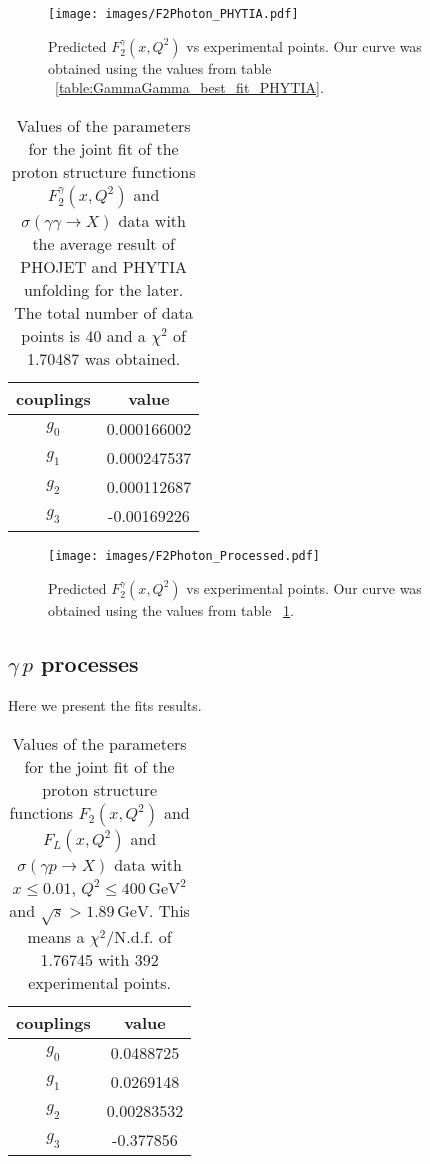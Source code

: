 \documentclass[preprint, 12pt]{elsarticle}
\begin{document}
\begin{figure}[!h]
\center
\texttt{[image: images/F2Photon\_PHYTIA.pdf]} 
\caption{Predicted $F_2^\gamma\left(x, Q^2\right)$ vs experimental points. Our curve was obtained using the values from table ~\ref{table:GammaGamma_best_fit_PHYTIA}.}
\label{fig:F2Photon_best_fit_PHYTIA}
\end{figure}

\begin{table}[b!]
\centering
\caption{Values of the parameters for the joint fit of the proton structure functions $F_2^{\gamma}\left(x, Q^2\right)$ and $\sigma\left(\gamma \gamma \rightarrow X\right)$ data with the average result of PHOJET and PHYTIA unfolding for the later. The total number of data points is 40 and a $\chi^2$ of 1.70487 was obtained.}
\vspace{0.5cm}
\begin{tabular}{|c|c|}
\hline
couplings   & value \\
\hline
$g_0$  & 0.000166002\\ 
\hline
$g_1$  & 0.000247537 \\ 
\hline
$g_2$  & 0.000112687  \\
\hline
$g_3$  & -0.00169226\\ 
\hline
\end{tabular}
\label{table:GammaGamma_best_fit_Processed}
\end{table}

\begin{figure}[!h]
\center
\texttt{[image: images/F2Photon\_Processed.pdf]} 
\caption{Predicted $F_2^\gamma\left(x, Q^2\right)$ vs experimental points. Our curve was obtained using the values from table ~\ref{table:GammaGamma_best_fit_Processed}.}
\label{fig:F2Photon_best_fit_Processed}
\end{figure}



\subsection{$\gamma \, p$ processes}

Here we present the fits results.

\begin{table}[b!]
\centering
\caption{Values of the parameters for the joint fit of the proton structure functions $F_2\left(x, Q^2\right)$ and $F_L\left(x, Q^2\right)$ and $\sigma\left(\gamma p \rightarrow X\right)$ data with $x \leq 0.01$, $Q^2 \leq 400 \, \text{GeV}^2$ and $\sqrt{s} > 1.89 \, \text{GeV}$. This means a $\chi^2 / \text{N.d.f.}$ of 1.76745 with 392 experimental points.}
\vspace{0.5cm}
\begin{tabular}{|c|c|}
\hline
couplings   & value \\
\hline
$g_0$  & 0.0488725\\ 
\hline
$g_1$  & 0.0269148 \\ 
\hline
$g_2$  & 0.00283532  \\
\hline
$g_3$  & -0.377856\\ 
\hline
\end{tabular}
\label{table:GammaP_best_fit}
\end{table}
\end{document}
